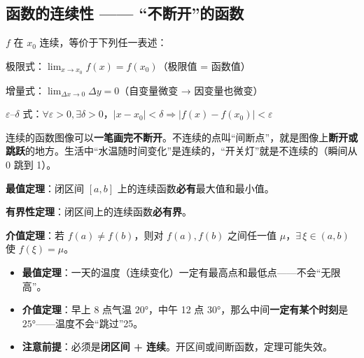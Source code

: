 \documentclass[11pt,a4paper]{article}
\newcommand{\keyw}[1]{\colorbox{cYellowL}{\textbf{\color{cOrange}#1}}}
\begin{document}
\newpage
\subsection{函数的连续性 —— “不断开”的函数}

\begin{defbox}[连续的三种等价定义]
$f$ 在 $x_0$ 连续，等价于下列任一表述：
\begin{cndot}
  \item 极限式：$\displaystyle\lim_{x\to x_0}f(x)=f(x_0)$（极限值 = 函数值）
  \item 增量式：$\displaystyle\lim_{\Delta x\to 0}\Delta y=0$（自变量微变 → 因变量也微变）
  \item $\varepsilon$–$\delta$ 式：$\forall\varepsilon>0,\exists\delta>0$，$|x-x_0|<\delta\Rightarrow|f(x)-f(x_0)|<\varepsilon$
\end{cndot}
\end{defbox}

\begin{plainbox}[白话解读：连续 = “一笔画”]
连续的函数图像可以\keyw{一笔画完不断开}。不连续的点叫“间断点”，就是图像上\textbf{断开或跳跃}的地方。生活中“水温随时间变化”是连续的，“开关灯”就是不连续的（瞬间从 0 跳到 1）。
\end{plainbox}

\begin{thmbox}[闭区间上连续函数的三大定理]
\begin{cndot}
  \item \textbf{最值定理}：闭区间 $[a,b]$ 上的连续函数\textbf{必有}最大值和最小值。
  \item \textbf{有界性定理}：闭区间上的连续函数\textbf{必有界}。
  \item \textbf{介值定理}：若 $f(a)\ne f(b)$，则对 $f(a),f(b)$ 之间任一值 $\mu$，$\exists\,\xi\in(a,b)$ 使 $f(\xi)=\mu$。
\end{cndot}
\end{thmbox}

\begin{plainbox}
\begin{itemize}[leftmargin=1.4em,itemsep=3pt]
  \item \textbf{最值定理}：一天的温度（连续变化）一定有最高点和最低点——不会“无限高”。
  \item \textbf{介值定理}：早上 8 点气温 $20°$，中午 12 点 $30°$，那么中间\textbf{一定有某个时刻}是 $25°$——温度不会“跳过”25。
  \item \textbf{注意前提}：必须是\keyw{闭区间 + 连续}。开区间或间断函数，定理可能失效。
\end{itemize}
\end{plainbox}
\end{document}
